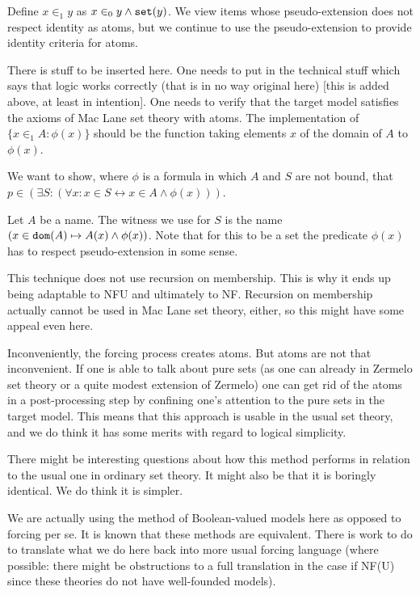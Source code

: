 \documentclass[12pt]{article}
\begin{document}
Define $x \in_1 y$ as $x \in_0 y \wedge {\tt set}(y)$.   We view items whose pseudo-extension does not respect identity as atoms, but we continue to use the pseudo-extension to provide identity criteria for atoms.

There is stuff to be inserted here.  One needs to put in the technical stuff which says that logic works correctly (that is in no way original here) [this is added above, at least in intention].  One needs
to verify that the target model satisfies the axioms of Mac Lane set theory with atoms.  The implementation of $\{x \in_1 A:\phi(x)\}$ should be the function
taking elements $x$ of the domain of $A$ to $\phi(x)$.

We want to show, where $\phi$ is a formula in which $A$ and $S$ are not bound, that $p \in (\exists S:(\forall x:x\in S \leftrightarrow x \in A \wedge \phi(x)))$.

Let $A$ be a name.  The witness we use for $S$ is the name $(x \in {\tt dom}(A)\mapsto A(x) \wedge \phi(x))$.  Note that for this to be a set the predicate $\phi(x)$ has to respect pseudo-extension in some sense.

This technique does not use recursion on membership.  This is why it ends up being adaptable to NFU and ultimately to NF.  Recursion on membership actually cannot be used in Mac Lane set theory, either, so this might have some appeal even here.

Inconveniently, the forcing process creates atoms.  But atoms are not that inconvenient.  If one is able to talk about pure sets (as one can already in Zermelo set theory or a quite modest extension of Zermelo)
one can get rid of the atoms in a post-processing step by confining one's attention to the pure sets in the target model.  This means that this approach is usable in the usual set theory, and we do think it has some merits with regard to logical simplicity.

There might be interesting questions about how this method performs in relation to the usual one in ordinary set theory.  It might also be that it is boringly identical.
We do think it is simpler.

We are actually using the method of Boolean-valued models here as opposed to forcing per se.  It is known that these methods are equivalent.  There is work to do to translate what we do here back into more usual forcing language (where possible:  there might be obstructions to a full translation in the case if NF(U) since these theories do not have well-founded models).
\end{document}
